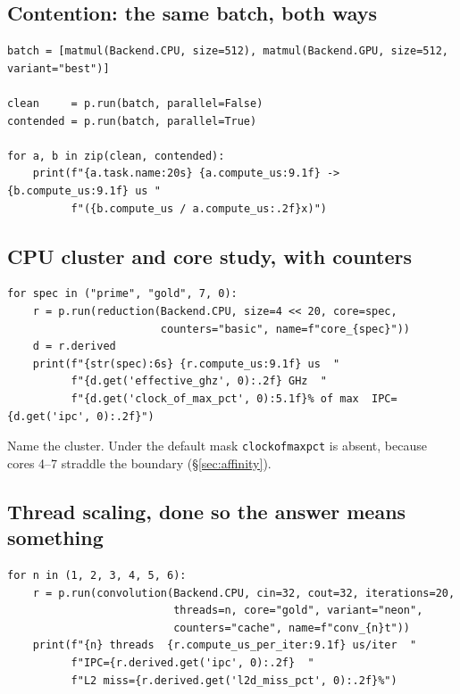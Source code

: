 \documentclass[11pt,a4paper]{article}
\newcommand{\code}[1]{\texttt{\let\_\breakableunderscore #1}}
\newcommand{\breakableunderscore}{\textunderscore\allowbreak}
\begin{document}
\subsection{Contention: the same batch, both ways}

\begin{lstlisting}
batch = [matmul(Backend.CPU, size=512), matmul(Backend.GPU, size=512, variant="best")]

clean     = p.run(batch, parallel=False)
contended = p.run(batch, parallel=True)

for a, b in zip(clean, contended):
    print(f"{a.task.name:20s} {a.compute_us:9.1f} -> {b.compute_us:9.1f} us "
          f"({b.compute_us / a.compute_us:.2f}x)")
\end{lstlisting}

\subsection{CPU cluster and core study, with counters}

\begin{lstlisting}
for spec in ("prime", "gold", 7, 0):
    r = p.run(reduction(Backend.CPU, size=4 << 20, core=spec,
                        counters="basic", name=f"core_{spec}"))
    d = r.derived
    print(f"{str(spec):6s} {r.compute_us:9.1f} us  "
          f"{d.get('effective_ghz', 0):.2f} GHz  "
          f"{d.get('clock_of_max_pct', 0):5.1f}% of max  IPC={d.get('ipc', 0):.2f}")
\end{lstlisting}

\noindent Name the cluster. Under the default mask \code{clock\_of\_max\_pct}
is absent, because cores 4--7 straddle the boundary (\S\ref{sec:affinity}).

\subsection{Thread scaling, done so the answer means something}

\begin{lstlisting}
for n in (1, 2, 3, 4, 5, 6):
    r = p.run(convolution(Backend.CPU, cin=32, cout=32, iterations=20,
                          threads=n, core="gold", variant="neon",
                          counters="cache", name=f"conv_{n}t"))
    print(f"{n} threads  {r.compute_us_per_iter:9.1f} us/iter  "
          f"IPC={r.derived.get('ipc', 0):.2f}  "
          f"L2 miss={r.derived.get('l2d_miss_pct', 0):.2f}%")
\end{lstlisting}
\end{document}
